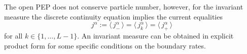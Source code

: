 \documentclass[12pt]{article}
\newcommand{\bra}[1]{\mbox{$\langle \, {#1}\, |$}}
\newcommand{\ket}[1]{\mbox{$| \, {#1}\, \rangle$}}
\newcommand{\exval}[1]{\mbox{$\langle \, {#1}\, \rangle$}}
\newcommand{\balpha}{\boldsymbol{\alpha}}
\begin{document}
The open PEP does not conserve particle number, however, for the invariant
measure the discrete continuity equation implies the current equalities
\begin{equation}
j^\alpha := \exval{j^\alpha_{-}} = \exval{j^\alpha_{k}} = \exval{j^\alpha_{+}}
\label{statcurrrel}
\end{equation}
for all $k\in\{1,\dots,L-1\}$. An invariant measure can be obtained in explicit
product form for some specific conditions on the boundary rates.
%
%
%
\end{document}
